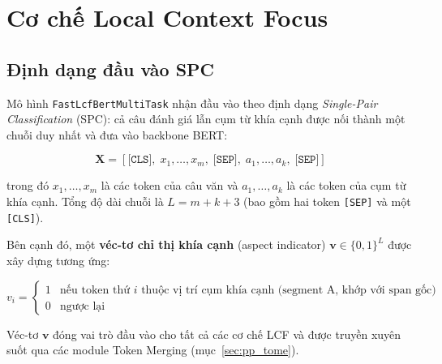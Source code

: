 
\section{Cơ chế Local Context Focus}
\label{sec:pp_lcf}

\subsection{Định dạng đầu vào SPC}
\label{subsec:spc}

Mô hình \texttt{FastLcfBertMultiTask} nhận đầu vào theo định dạng
\textit{Single-Pair Classification} (SPC): cả câu đánh giá lẫn cụm từ
khía cạnh được nối thành một chuỗi duy nhất và đưa vào backbone BERT:

\begin{equation}
  \mathbf{X} = [\texttt{[CLS]},\; x_1, \dots, x_m,\;
                \texttt{[SEP]},\; a_1, \dots, a_k,\;
                \texttt{[SEP]}]
  \label{eq:spc}
\end{equation}

\noindent trong đó $x_1, \dots, x_m$ là các token của câu văn và
$a_1, \dots, a_k$ là các token của cụm từ khía cạnh.  Tổng độ dài
chuỗi là $L = m + k + 3$ (bao gồm hai token \texttt{[SEP]} và một
\texttt{[CLS]}).

Bên cạnh đó, một \textbf{véc-tơ chỉ thị khía cạnh} (aspect indicator)
$\mathbf{v} \in \{0, 1\}^{L}$ được xây dựng tương ứng:

\begin{equation}
  v_i = \begin{cases}
    1 & \text{nếu token thứ } i \text{ thuộc vị trí cụm khía cạnh
        (segment A, khớp với span gốc)}\\
    0 & \text{ngược lại}
  \end{cases}
  \label{eq:aspect_indicator}
\end{equation}

Véc-tơ $\mathbf{v}$ đóng vai trò đầu vào cho tất cả các cơ chế LCF và
được truyền xuyên suốt qua các module Token Merging (mục~\ref{sec:pp_tome}).

